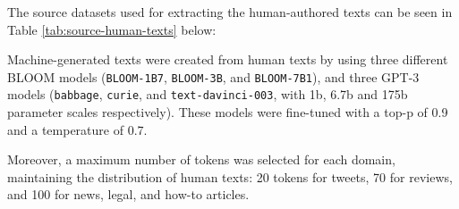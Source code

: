 \documentclass[a4paper,11pt,twocolumn,twoside]{article}
\begin{document}
The source datasets used for extracting the human-authored texts can be seen in Table \ref{tab:source-human-texts} below:
\begin{table}[!h]
    \centering
    \caption{Human-authored source datasets.}
    \label{tab:source-human-texts}
\end{table}

Machine-generated texts were created from human texts by using three different BLOOM models (\texttt{BLOOM-1B7}, \texttt{BLOOM-3B}, and \texttt{BLOOM-7B1}), and three GPT-3 models (\texttt{babbage}, \texttt{curie}, and \texttt{text-davinci-003}, with 1b, 6.7b and 175b parameter scales respectively). These models were fine-tuned with a top-p of 0.9 and a temperature of 0.7.

Moreover, a maximum number of tokens was selected for each domain, maintaining the distribution of human texts: 20 tokens for tweets, 70 for reviews, and 100 for news, legal, and how-to articles. %
\end{document}
